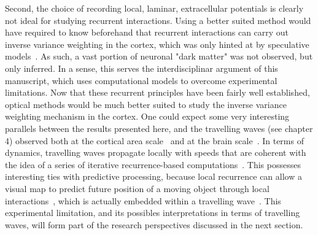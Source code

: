 Second, the choice of recording local, laminar, extracellular potentials is clearly not ideal for studying recurrent interactions. Using a better suited method would have required to know beforehand that recurrent interactions can carry out inverse variance weighting in the cortex, which was only hinted at by speculative models~\cite{bastos2012canonical, friston2005theory}. As such, a vast portion of neuronal "dark matter" was not observed, but only inferred. In a sense, this serves the interdisciplinar argument of this manuscript, which uses computational models to overcome experimental limitations. Now that these recurrent principles have been fairly well established, optical methods would be much better suited to study the inverse variance weighting mechanism in the cortex. One could expect some very interesting parallels between the results presented here, and the travelling waves (see chapter 4) observed both at the cortical area scale~\cite{chavane2011lateral} and at the brain scale~\cite{muller2018cortical, alamia2019alpha}. In terms of dynamics, travelling waves propagate locally with speeds that are coherent with the idea of a series of iterative recurrence-based computations~\cite{chavane2011lateral, chavane2022revisiting}. This possesses interesting ties with predictive processing, because local recurrence can allow a visual map to predict future position of a moving object through local interactions~\cite{britten1992analysis}, which is actually embedded within a travelling wave~\cite{benigno2023waves}. This experimental limitation, and its possibles interpretations in terms of travelling waves, will form part of the research perspectives discussed in the next section. 




